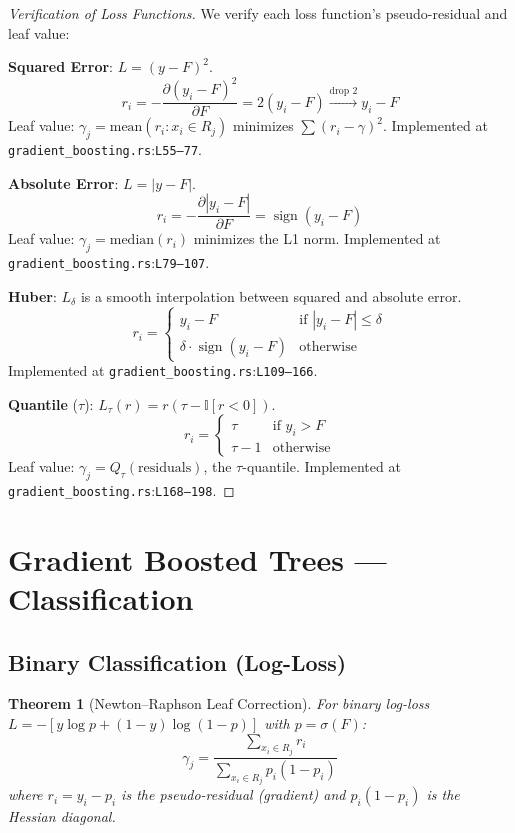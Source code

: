 \documentclass[11pt,a4paper]{article}
\newtheorem{theorem}{Theorem}[section]
\theoremstyle{remark}
\newcommand{\coderef}[2]{\texttt{#1}:\texttt{L#2}}
\newcommand{\II}{\mathbb{I}}
\newcommand{\sign}{\operatorname{sign}}
\begin{document}
\begin{proof}[Verification of Loss Functions]
We verify each loss function's pseudo-residual and leaf value:

\medskip
\textbf{Squared Error}: $L = (y - F)^2$.
\[
  r_i = -\frac{\partial (y_i - F)^2}{\partial F} = 2(y_i - F) \xrightarrow{\text{drop 2}} y_i - F
\]
Leaf value: $\gamma_j = \text{mean}(r_i : x_i \in R_j)$ minimizes $\sum(r_i - \gamma)^2$.
Implemented at \coderef{gradient\_boosting.rs}{55--77}. \checkmark

\medskip
\textbf{Absolute Error}: $L = |y - F|$.
\[
  r_i = -\frac{\partial |y_i - F|}{\partial F} = \sign(y_i - F)
\]
Leaf value: $\gamma_j = \text{median}(r_i)$ minimizes the L1 norm.
Implemented at \coderef{gradient\_boosting.rs}{79--107}. \checkmark

\medskip
\textbf{Huber}: $L_\delta$ is a smooth interpolation between squared and absolute error.
\[
  r_i = \begin{cases}
    y_i - F & \text{if } |y_i - F| \leq \delta \\
    \delta \cdot \sign(y_i - F) & \text{otherwise}
  \end{cases}
\]
Implemented at \coderef{gradient\_boosting.rs}{109--166}. \checkmark

\medskip
\textbf{Quantile} ($\tau$): $L_\tau(r) = r(\tau - \II[r < 0])$.
\[
  r_i = \begin{cases}
    \tau & \text{if } y_i > F \\
    \tau - 1 & \text{otherwise}
  \end{cases}
\]
Leaf value: $\gamma_j = Q_\tau(\text{residuals})$, the $\tau$-quantile.
Implemented at \coderef{gradient\_boosting.rs}{168--198}. \checkmark
\end{proof}

\section{Gradient Boosted Trees --- Classification}
\label{sec:gbt-cls}

\subsection{Binary Classification (Log-Loss)}

\begin{theorem}[Newton--Raphson Leaf Correction]
\label{thm:newton-leaf}
For binary log-loss $L = -[y\log p + (1-y)\log(1-p)]$ with $p = \sigma(F)$:
\begin{equation}
  \gamma_j = \frac{\sum_{x_i \in R_j} r_i}{\sum_{x_i \in R_j} p_i(1 - p_i)}
  \label{eq:newton-binary}
\end{equation}
where $r_i = y_i - p_i$ is the pseudo-residual (gradient) and
$p_i(1-p_i)$ is the Hessian diagonal.
\end{theorem}
\end{document}
